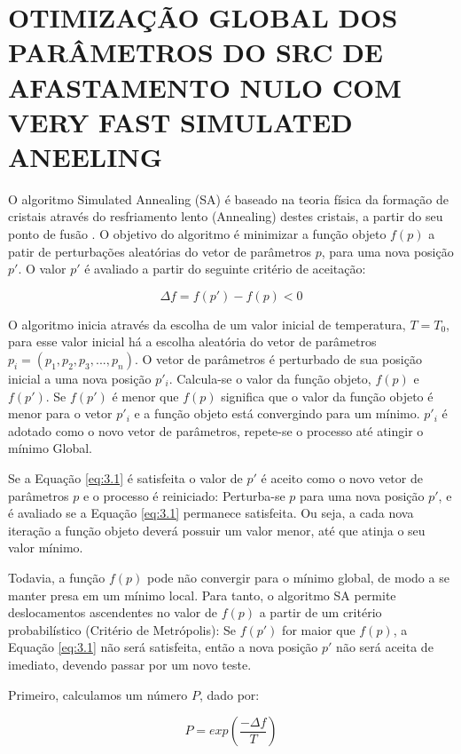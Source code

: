 \chapter{OTIMIZAÇÃO GLOBAL DOS PARÂMETROS DO SRC DE AFASTAMENTO NULO COM VERY FAST SIMULATED ANEELING}
\label{cap3:vfsa}

O algoritmo Simulated Annealing (SA) é baseado na teoria física da formação de cristais
através do resfriamento lento (Annealing) destes cristais, a partir do seu ponto de fusão \cite{ingber}.
O objetivo do algoritmo é minimizar a função objeto $f(p)$ a patir de perturbações aleatórias do vetor de parâmetros $p$,
para uma nova posição $p'$. O valor $p'$ é avaliado a partir do seguinte critério de aceitação:

\begin{equation}
\label{eq:3.1}
 \Delta f=f(p')-f(p) < 0
\end{equation}

O algoritmo inicia através da escolha de um valor inicial de temperatura, $T=T_0$, para esse valor inicial há
a escolha aleatória do vetor de parâmetros $p_i=(p_1,p_2,p_3,...,p_n)$. O vetor de parâmetros é perturbado 
de sua posição inicial a uma nova posição $p'_i$. Calcula-se o valor da função objeto, $f(p)$ e $f(p')$. Se $f(p')$ é
menor que $f(p)$ significa que o valor da função objeto é menor para o vetor $p'_i$
e a função objeto está convergindo para um mínimo. $p'_i$ é adotado como o
novo vetor de parâmetros, repete-se o processo até atingir o mínimo Global.

Se a Equação \ref{eq:3.1} é satisfeita o valor de $p'$ é aceito como o novo vetor de parâmetros $p$ e o processo
é reiniciado: Perturba-se $p$ para uma nova posição $p'$, e é avaliado se a Equação \ref{eq:3.1} permanece satisfeita. 
Ou seja, a cada nova
iteração a função objeto deverá possuir um valor menor, até que atinja o seu valor mínimo.

Todavia, a função $f(p)$ pode não convergir para o mínimo global, de modo a se manter presa
em um mínimo local. Para tanto, o algoritmo SA permite deslocamentos ascendentes no valor de $f(p)$ a partir de um critério
probabilístico (Critério de Metrópolis): Se $f(p')$ for maior que $f(p)$, a Equação \ref{eq:3.1} não será satisfeita, então
a nova posição $p'$ não será aceita de imediato, devendo passar por um novo teste.

Primeiro, calculamos um número $P$, dado por:

\begin{equation}
\label{eq:3.2}
 P=exp(\frac{-\Delta f}{T})
\end{equation}

